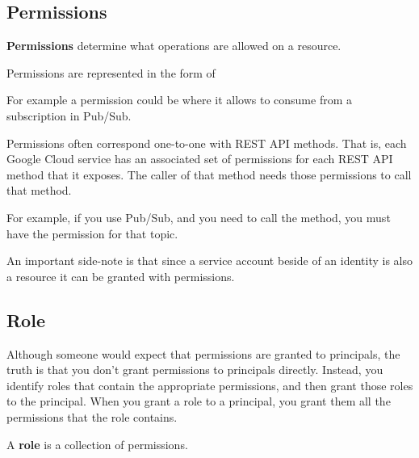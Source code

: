 \subsection{Permissions}

\bd[Permissions]
\textbf{Permissions} determine what operations are allowed on a resource.
\ed

Permissions are represented in the form of 

\be
For example a permission could be  where it allows to consume from a subscription
in Pub/Sub.
\ee

Permissions often correspond one-to-one with REST API methods. That is, each Google Cloud service has an associated
set of permissions for each REST API method that it exposes. The caller of that method needs those permissions to
call that method.

\be
For example, if you use Pub/Sub, and you need to call the  method, you must have the
 permission for that topic.
\ee

An important side-note is that since a service account beside of an identity is also a resource it can be granted with
permissions.

\subsection{Role}

Although someone would expect that permissions are granted to principals, the truth is that you don't grant permissions
to principals directly. Instead, you identify roles that contain the appropriate permissions, and then grant those
roles to the principal. When you grant a role to a principal, you grant them all the permissions that the role contains.

\bd[Role]
A \textbf{role} is a collection of permissions.
\ed


